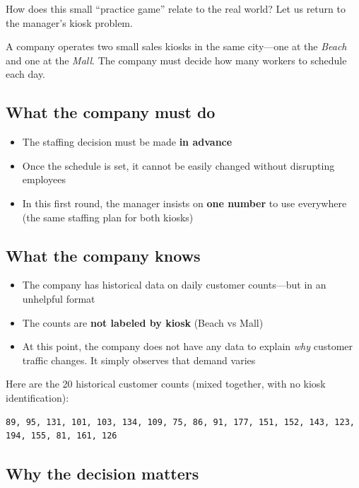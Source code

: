 \documentclass[
  12pt,
  letterpaper,
  DIV=11,
  numbers=noendperiod]{scrreprt}
\providecommand{\tightlist}{%
  \setlength{\itemsep}{0pt}\setlength{\parskip}{0pt}}
\begin{document}
How does this small ``practice game'' relate to the real world? Let us
return to the manager's kiosk problem.

A company operates two small sales kiosks in the same city---one at the
\emph{Beach} and one at the \emph{Mall}. The company must decide how
many workers to schedule each day.

\subsection{What the company must do}\label{what-the-company-must-do}

\begin{itemize}
\tightlist
\item
  The staffing decision must be made \textbf{in advance}
\item
  Once the schedule is set, it cannot be easily changed without
  disrupting employees
\item
  In this first round, the manager insists on \textbf{one number} to use
  everywhere (the same staffing plan for both kiosks)
\end{itemize}

\subsection{What the company knows}\label{what-the-company-knows}

\begin{itemize}
\tightlist
\item
  The company has historical data on daily customer counts---but in an
  unhelpful format
\item
  The counts are \textbf{not labeled by kiosk} (Beach vs Mall)
\item
  At this point, the company does not have any data to explain
  \emph{why} customer traffic changes. It simply observes that demand
  varies
\end{itemize}

Here are the 20 historical customer counts (mixed together, with no
kiosk identification):

\begin{lstlisting}
89, 95, 131, 101, 103, 134, 109, 75, 86, 91, 177, 151, 152, 143, 123, 194, 155, 81, 161, 126
\end{lstlisting}

\subsection{Why the decision matters}\label{why-the-decision-matters}
\end{document}
